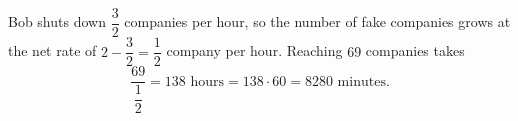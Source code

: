 Bob shuts down $\dfrac32$ companies per hour, so the number of fake companies grows at the net rate of $2-\dfrac32=\dfrac12$ company per hour. Reaching $69$ companies takes
\[\dfrac{69}{\dfrac12}=138\text{ hours}=138\cdot60=\boxed{8280}\text{ minutes}.\]
